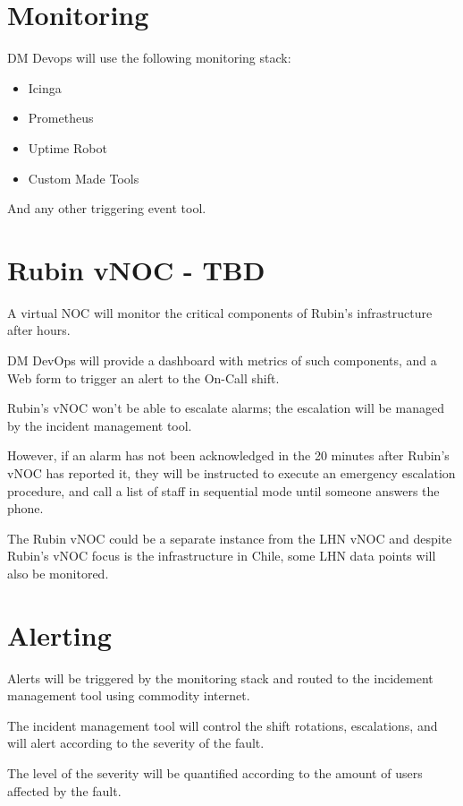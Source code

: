 \section{Monitoring}

DM Devops will use the following monitoring stack:

\begin{itemize}
    \item Icinga
    \item Prometheus
    \item Uptime Robot
    \item Custom Made Tools
\end{itemize}

And any other triggering event tool. 

\section{Rubin vNOC - TBD}

A virtual NOC will monitor the critical components of Rubin's infrastructure after hours. 

DM DevOps will provide a dashboard with metrics of such components, and a Web form to trigger an alert to the On-Call shift.  

Rubin's vNOC won't be able to escalate alarms; the escalation will be managed by the incident management tool.

However, if an alarm has not been acknowledged in the 20 minutes after Rubin's vNOC has reported it, they will be instructed to execute an emergency escalation procedure, and call a list of staff in sequential mode until someone answers the phone.

The Rubin vNOC could be a separate instance from the LHN vNOC and despite Rubin’s vNOC focus is the infrastructure in Chile, some LHN data points will also be monitored. 


\section{Alerting}

Alerts will be triggered by the monitoring stack and routed to the incidement management tool using commodity internet. 

The incident management tool will control the shift rotations, escalations, and will alert according to the severity of the fault. 

The level of the severity will be quantified according to the amount of users affected by the fault.


